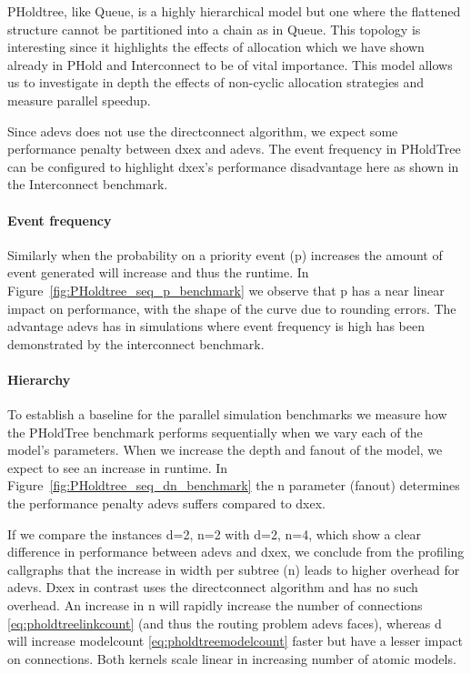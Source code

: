 PHoldtree, like Queue, is a highly hierarchical model but one where the flattened structure cannot be partitioned into a chain as in Queue.
This topology is interesting since it highlights the effects of allocation which we have shown already in PHold and Interconnect to be of vital importance.
This model allows us to investigate in depth the effects of non-cyclic allocation strategies and measure parallel speedup.

Since adevs does not use the directconnect algorithm, we expect some performance penalty between dxex and adevs.
The event frequency in PHoldTree can be configured to highlight dxex's performance disadvantage here as shown in the Interconnect benchmark.

\paragraph*{Event frequency}
Similarly when the probability on a priority event (p) increases the amount of event generated will increase and thus the runtime.
In Figure~\ref{fig:PHoldtree_seq_p_benchmark} we observe that p has a near linear impact on performance, with the shape of the curve due to rounding errors.
The advantage adevs has in simulations where event frequency is high has been demonstrated by the interconnect benchmark.

\paragraph*{Hierarchy}
To establish a baseline for the parallel simulation benchmarks we measure how the PHoldTree benchmark performs sequentially when we vary each of the model's parameters.
When we increase the depth and fanout of the model, we expect to see an increase in runtime.
In Figure~\ref{fig:PHoldtree_seq_dn_benchmark} the n parameter (fanout) determines the performance penalty adevs suffers compared to dxex.

If we compare the instances d=2, n=2 with d=2, n=4, which show a clear difference in performance between adevs and dxex, we conclude from the profiling callgraphs that the increase in width per subtree (n) leads to higher overhead for adevs.
Dxex in contrast uses the directconnect algorithm and has no such overhead.
An increase in n will rapidly increase the number of connections \ref{eq:pholdtreelinkcount} (and thus the routing problem adevs faces), whereas d will increase modelcount \ref{eq:pholdtreemodelcount} faster but have a lesser impact on connections.
Both kernels scale linear in increasing number of atomic models.

